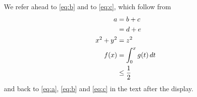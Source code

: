 \documentclass{article}
\begin{document}
We refer ahead to \eqref{eq:b} and to \ref{eq:c}, which follow from
\begin{align}
a &= b + c \label{eq:a} \\
  &= d + e \notag \\
\label{eq:b} x^2 + y^2 &= z^2 \\
f(x) &= \int_0^x g(t)\,dt \nonumber \\
  &\le \frac{1}{2} \label{eq:c}
\end{align}
and back to \eqref{eq:a}, \eqref{eq:b} and \eqref{eq:c} in the text after the display.
\end{document}

